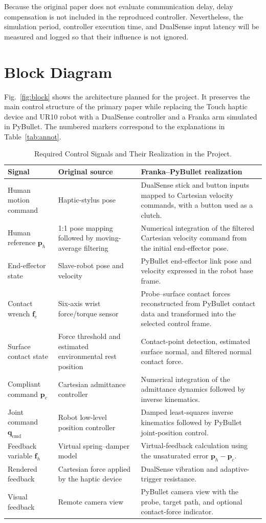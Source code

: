 \documentclass[journal]{IEEEtran}
\newcommand{\p}{\bm{p}}
\newcommand{\f}{\bm{f}}
\begin{document}
Because the original paper does not evaluate communication delay, delay compensation is not included in the reproduced controller. Nevertheless, the simulation period, controller execution time, and DualSense input latency will be measured and logged so that their influence is not ignored.

\section{Block Diagram}
Fig.~\ref{fig:block} shows the architecture planned for the project. It preserves the main control structure of the primary paper while replacing the Touch haptic device and UR10 robot with a DualSense controller and a Franka arm simulated in PyBullet. The numbered markers correspond to the explanations in Table~\ref{tab:annot}.

\begin{table}[!t]
\caption{Required Control Signals and Their Realization in the Project.}
\label{tab:signals}
\centering\small
\renewcommand{\arraystretch}{1.1}
\begin{tabularx}{\textwidth}{@{}p{3.1cm}p{4.4cm}X@{}}
\toprule
Signal & Original source & Franka--PyBullet realization\\
\midrule
Human motion command & Haptic-stylus pose & DualSense stick and button inputs mapped to Cartesian velocity commands, with a button used as a clutch.\\
Human reference $\p_h$ & 1:1 pose mapping followed by moving-average filtering & Numerical integration of the filtered Cartesian velocity command from the initial end-effector pose.\\
End-effector state & Slave-robot pose and velocity & PyBullet end-effector link pose and velocity expressed in the robot base frame.\\
Contact wrench $\f_e$ & Six-axis wrist force/torque sensor & Probe--surface contact forces reconstructed from PyBullet contact data and transformed into the selected control frame.\\
Surface contact state & Force threshold and estimated environmental rest position & Contact-point detection, estimated surface normal, and filtered normal contact force.\\
Compliant command $\p_c$ & Cartesian admittance controller & Numerical integration of the admittance dynamics followed by inverse kinematics.\\
Joint command $\bm{q}_{\mathrm{cmd}}$ & Robot low-level position controller & Damped least-squares inverse kinematics followed by PyBullet joint-position control.\\
Feedback variable $\f_h$ & Virtual spring--damper model & Virtual-feedback calculation using the unsaturated error $\p_h-\p_c$.\\
Rendered feedback & Cartesian force applied by the haptic device & DualSense vibration and adaptive-trigger resistance.\\
Visual feedback & Remote camera view & PyBullet camera view with the probe, target path, and optional contact-force indicator.\\
\bottomrule
\end{tabularx}
\end{table}
\end{document}
